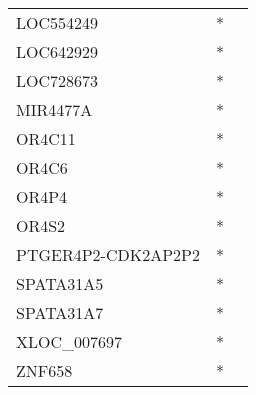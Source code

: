 \begin{longtable}{lcc}
LOC554249          &  * &         \\
LOC642929          &  * &         \\
LOC728673          &  * &         \\
MIR4477A           &  * &         \\
OR4C11             &  * &         \\
OR4C6              &  * &         \\
OR4P4              &  * &         \\
OR4S2              &  * &         \\
PTGER4P2-CDK2AP2P2 &  * &         \\
SPATA31A5          &  * &         \\
SPATA31A7          &  * &         \\
XLOC\_007697        &  * &         \\
ZNF658             &  * &         \\
\end{longtable}
